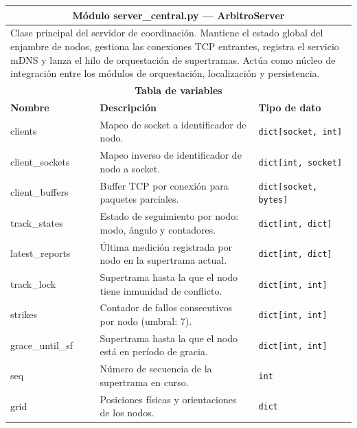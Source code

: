 \begin{table}[h!]
\centering
\small
\renewcommand{\arraystretch}{1.25}
\begin{tabular}{|p{2.8cm}|p{5.5cm}|p{2.8cm}|p{1.7cm}|}
\hline
\multicolumn{4}{|c|}{\textbf{Módulo server\_central.py — ArbitroServer}} \\
\hline
\multicolumn{4}{|p{12.8cm}|}{Clase principal del servidor de coordinación. Mantiene
el estado global del enjambre de nodos, gestiona las conexiones TCP entrantes,
registra el servicio mDNS y lanza el hilo de orquestación de supertramas. Actúa
como núcleo de integración entre los módulos de orquestación, localización y
persistencia.} \\
\hline
\multicolumn{4}{|c|}{\textbf{Tabla de variables}} \\
\hline
\textbf{Nombre} & \textbf{Descripción} & \multicolumn{2}{l|}{\textbf{Tipo de dato}} \\
\hline
clients & Mapeo de socket a identificador de nodo. & \multicolumn{2}{l|}{\texttt{dict[socket, int]}} \\
\hline
client\_sockets & Mapeo inverso de identificador de nodo a socket. & \multicolumn{2}{l|}{\texttt{dict[int, socket]}} \\
\hline
client\_buffers & Buffer TCP por conexión para paquetes parciales. & \multicolumn{2}{l|}{\texttt{dict[socket, bytes]}} \\
\hline
track\_states & Estado de seguimiento por nodo: modo, ángulo y contadores. & \multicolumn{2}{l|}{\texttt{dict[int, dict]}} \\
\hline
latest\_reports & Última medición registrada por nodo en la supertrama actual. & \multicolumn{2}{l|}{\texttt{dict[int, dict]}} \\
\hline
track\_lock & Supertrama hasta la que el nodo tiene inmunidad de conflicto. & \multicolumn{2}{l|}{\texttt{dict[int, int]}} \\
\hline
strikes & Contador de fallos consecutivos por nodo (umbral: 7). & \multicolumn{2}{l|}{\texttt{dict[int, int]}} \\
\hline
grace\_until\_sf & Supertrama hasta la que el nodo está en período de gracia. & \multicolumn{2}{l|}{\texttt{dict[int, int]}} \\
\hline
seq & Número de secuencia de la supertrama en curso. & \multicolumn{2}{l|}{\texttt{int}} \\
\hline
grid & Posiciones físicas y orientaciones de los nodos. & \multicolumn{2}{l|}{\texttt{dict}} \\

\end{tabular}
\end{table}
